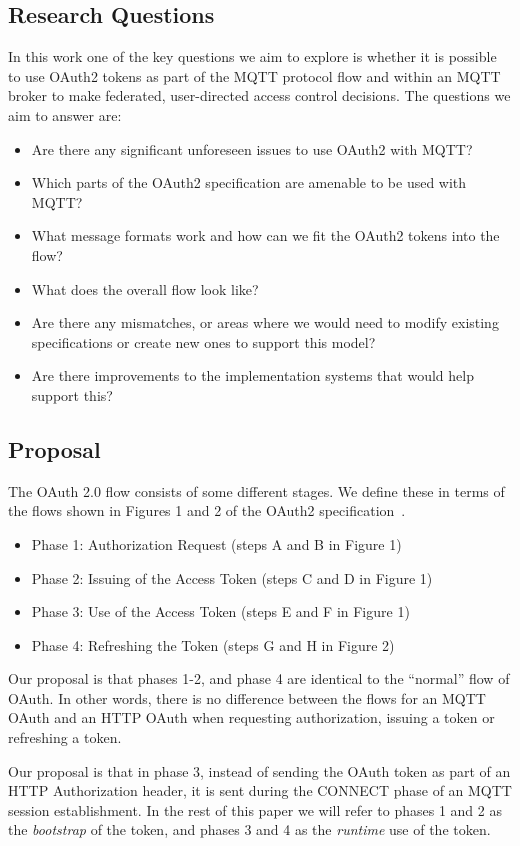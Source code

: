 \documentclass{llncs}
\begin{document}
\subsection{Research Questions}
In this work one of the key questions we aim to explore is whether it is possible to use 
OAuth2 tokens as part of the 
MQTT protocol flow and within an MQTT broker to make federated, user-directed access control 
decisions. The questions we aim to answer are:
\begin{itemize}
\item Are there any significant unforeseen issues to use OAuth2 with MQTT? 
\item Which parts of the OAuth2 specification are amenable to be used with MQTT?
\item What message formats work and how can we fit the OAuth2 tokens into the flow?
\item What does the overall flow look like?
\item Are there any mismatches, or areas where we would need to modify existing specifications or 
create new ones to support this model?
\item Are there improvements to the implementation systems that would help support this?
\end{itemize}

\subsection{Proposal}
The OAuth 2.0 flow consists of some different stages. We define these in terms of the 
flows shown in Figures 1 and 2 of the  OAuth2 specification~\cite{rfc6749}.
\begin{itemize}
\item Phase 1: Authorization Request (steps A and B in Figure 1)
\item Phase 2: Issuing of the Access Token (steps C and D in Figure 1)
\item Phase 3: Use of the Access Token (steps E and F in Figure 1)
\item Phase 4: Refreshing the Token (steps G and H in Figure 2)
\end{itemize}

Our proposal is that phases 1-2, and phase 4 are identical to the ``normal'' flow of OAuth. 
In other words, there is no difference between the flows for an MQTT OAuth and an HTTP OAuth 
when requesting authorization, issuing a token or 
refreshing a token.

Our proposal is that in phase 3, instead of sending the OAuth token as part of an HTTP 
Authorization header, it is sent during the CONNECT phase of an MQTT session establishment. 
In the rest of this paper we will refer to phases 1 and 2 as the \emph{bootstrap} of the token, and
phases 3 and 4 as the \emph{runtime} use of the token.
\end{document}
